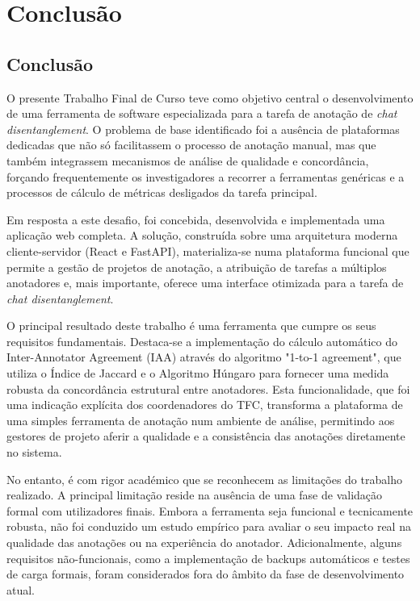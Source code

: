 \chapter{Conclusão}
\label{cha:conclusao}

\section{Conclusão}

O presente Trabalho Final de Curso teve como objetivo central o desenvolvimento de uma ferramenta de software especializada para a tarefa de anotação de \textit{chat disentanglement}. O problema de base identificado foi a ausência de plataformas dedicadas que não só facilitassem o processo de anotação manual, mas que também integrassem mecanismos de análise de qualidade e concordância, forçando frequentemente os investigadores a recorrer a ferramentas genéricas e a processos de cálculo de métricas desligados da tarefa principal.

Em resposta a este desafio, foi concebida, desenvolvida e implementada uma aplicação web completa. A solução, construída sobre uma arquitetura moderna cliente-servidor (React e FastAPI), materializa-se numa plataforma funcional que permite a gestão de projetos de anotação, a atribuição de tarefas a múltiplos anotadores e, mais importante, oferece uma interface otimizada para a tarefa de \textit{chat disentanglement}.

O principal resultado deste trabalho é uma ferramenta que cumpre os seus requisitos fundamentais. Destaca-se a implementação do cálculo automático do Inter-Annotator Agreement (IAA) através do algoritmo "1-to-1 agreement", que utiliza o Índice de Jaccard e o Algoritmo Húngaro para fornecer uma medida robusta da concordância estrutural entre anotadores. Esta funcionalidade, que foi uma indicação explícita dos coordenadores do TFC, transforma a plataforma de uma simples ferramenta de anotação num ambiente de análise, permitindo aos gestores de projeto aferir a qualidade e a consistência das anotações diretamente no sistema.

No entanto, é com rigor académico que se reconhecem as limitações do trabalho realizado. A principal limitação reside na ausência de uma fase de validação formal com utilizadores finais. Embora a ferramenta seja funcional e tecnicamente robusta, não foi conduzido um estudo empírico para avaliar o seu impacto real na qualidade das anotações ou na experiência do anotador. Adicionalmente, alguns requisitos não-funcionais, como a implementação de backups automáticos e testes de carga formais, foram considerados fora do âmbito da fase de desenvolvimento atual.

